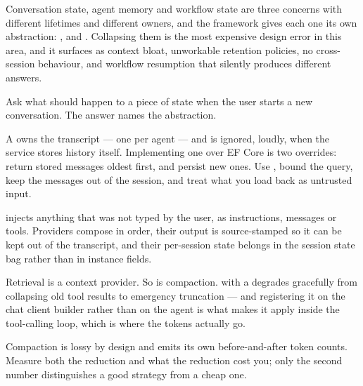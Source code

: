 Conversation state, agent memory and workflow state are three concerns with
different lifetimes and different owners, and the framework gives each one its
own abstraction: ,  and
. Collapsing them is the most expensive design error in
this area, and it surfaces as context bloat, unworkable retention policies, no
cross-session behaviour, and workflow resumption that silently produces different
answers.

Ask what should happen to a piece of state when the user starts a new
conversation. The answer names the abstraction.

A  owns the transcript --- one per agent --- and is
ignored, loudly, when the service stores history itself. Implementing one over EF
Core is two overrides: return stored messages oldest first, and persist new ones.
Use , bound the query, keep the messages out of the
session, and treat what you load back as untrusted input.

 injects anything that was not typed by the user, as
instructions, messages or tools. Providers compose in order, their output is
source-stamped so it can be kept out of the transcript, and their per-session
state belongs in the session state bag rather than in instance fields.

Retrieval is a context provider. So is compaction.  with
a  degrades gracefully from collapsing old tool
results to emergency truncation --- and registering it on the chat client builder
rather than on the agent is what makes it apply inside the tool-calling loop,
which is where the tokens actually go.

Compaction is lossy by design and emits its own before-and-after token counts.
Measure both the reduction and what the reduction cost you; only the second
number distinguishes a good strategy from a cheap one.

